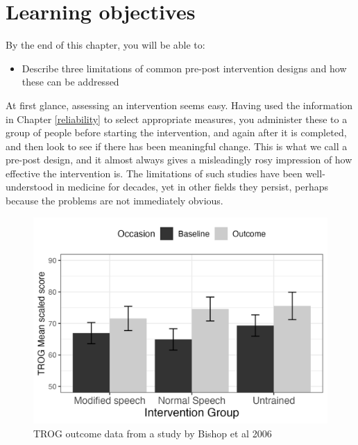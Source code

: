 \documentclass{krantz}
\providecommand{\tightlist}{%
\setlength{\itemsep}{0pt}\setlength{\parskip}{0pt}}
\begin{document}
\hypertarget{learning-objectives-4}{%
\section{Learning objectives}\label{learning-objectives-4}}

By the end of this chapter, you will be able to:

\begin{itemize}
\tightlist
\item
  Describe three limitations of common pre-post intervention designs and how these can be addressed
\end{itemize}

At first glance, assessing an intervention seems easy. Having used the information in Chapter \ref{reliability} to select appropriate measures, you administer these to a group of people before starting the intervention, and again after it is completed, and then look to see if there has been meaningful change. This is what we call a pre-post design, and it almost always gives a misleadingly rosy impression of how effective the intervention is. The limitations of such studies have been well-understood in medicine for decades, yet in other fields they persist, perhaps because the problems are not immediately obvious.

\begin{figure}
\includegraphics[width=0.75\linewidth]{images_bw/trogchangefig} \caption{TROG outcome data from a study by Bishop et al 2006}\label{fig:trogfig}
\end{figure}
\end{document}
